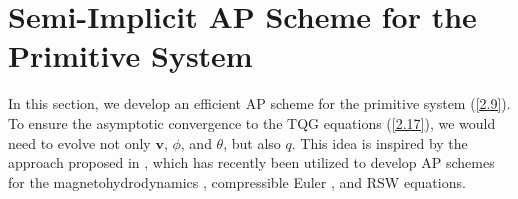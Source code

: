 \documentclass[a4paper,11pt,twoside]{article}
\numberwithin{equation}{section}
\numberwithin{figure}{section}
\numberwithin{table}{section}
\newcommand{\bv}{\bm{v}}
\newcommand\eref[1]{(\ref{#1})}
\begin{document}
\section{Semi-Implicit AP Scheme for the Primitive System}\label{sec3}
In this section, we develop an efficient AP scheme for the primitive system \eref{2.9}. To ensure the asymptotic convergence to the TQG 
equations \eref{2.17}, we would need to evolve not only $\bv$, $\phi$, and $\theta$, but also $q$. This idea is inspired by the approach 
proposed in \cite{Abgrall_2023}, which has recently been utilized to develop AP schemes for the magnetohydrodynamics \cite{Chen_2024}, 
compressible Euler \cite{Huang_2025}, and RSW \cite{Zhang_2026} equations.
\end{document}
